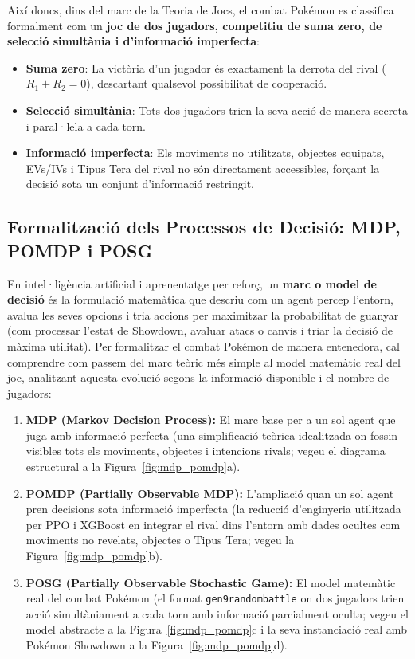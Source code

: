 Així doncs, dins del marc de la Teoria de Jocs, el combat Pokémon es classifica formalment com un \textbf{joc de dos jugadors, competitiu de suma zero, de selecció simultània i d'informació imperfecta}:
\begin{itemize}
    \item \textbf{Suma zero}: La victòria d'un jugador és exactament la derrota del rival ($R_1 + R_2 = 0$), descartant qualsevol possibilitat de cooperació.
    \item \textbf{Selecció simultània}: Tots dos jugadors trien la seva acció de manera secreta i paral·lela a cada torn.
    \item \textbf{Informació imperfecta}: Els moviments no utilitzats, objectes equipats, EVs/IVs i Tipus Tera del rival no són directament accessibles, forçant la decisió sota un conjunt d'informació restringit.
\end{itemize}

\subsection{Formalització dels Processos de Decisió: MDP, POMDP i POSG}
\label{subsec:formalitzacio_posg}

En intel·ligència artificial i aprenentatge per reforç, un \textbf{marc o model de decisió} és la formulació matemàtica que descriu com un agent percep l'entorn, avalua les seves opcions i tria accions per maximitzar la probabilitat de guanyar (com processar l'estat de Showdown, avaluar atacs o canvis i triar la decisió de màxima utilitat). Per formalitzar el combat Pokémon de manera entenedora, cal comprendre com passem del marc teòric més simple al model matemàtic real del joc, analitzant aquesta evolució segons la informació disponible i el nombre de jugadors:
\begin{enumerate}
    \item \textbf{MDP (Markov Decision Process):} El marc base per a un sol agent que juga amb informació perfecta (una simplificació teòrica idealitzada on fossin visibles tots els moviments, objectes i intencions rivals; vegeu el diagrama estructural a la Figura~\ref{fig:mdp_pomdp}a).
    \item \textbf{POMDP (Partially Observable MDP):} L'ampliació quan un sol agent pren decisions sota informació imperfecta (la reducció d'enginyeria utilitzada per PPO i XGBoost en integrar el rival dins l'entorn amb dades ocultes com moviments no revelats, objectes o Tipus Tera; vegeu la Figura~\ref{fig:mdp_pomdp}b).
    \item \textbf{POSG (Partially Observable Stochastic Game):} El model matemàtic real del combat Pokémon (el format \texttt{gen9randombattle} on dos jugadors trien acció simultàniament a cada torn amb informació parcialment oculta; vegeu el model abstracte a la Figura~\ref{fig:mdp_pomdp}c i la seva instanciació real amb Pokémon Showdown a la Figura~\ref{fig:mdp_pomdp}d).
\end{enumerate}

